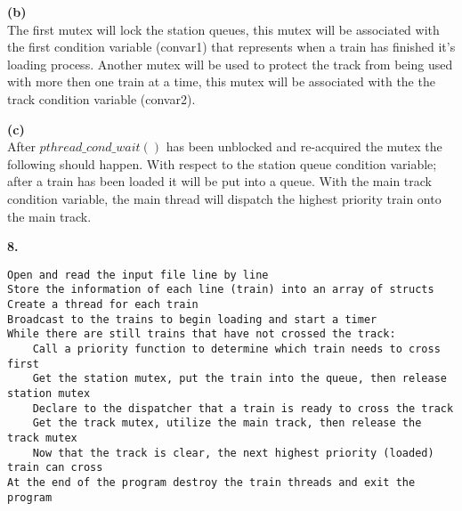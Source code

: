 \documentclass{article}
\begin{document}
\smallskip
{\bf (b)}\\
The first mutex will lock the station queues, this mutex will be associated with the first condition variable (convar1) that represents when a train has finished it's loading process.
Another mutex will be used to protect the track from being used with more then one train at a time, this mutex will be associated with the the track condition variable (convar2).

\smallskip
{\bf (c)}\\
After $pthread\_cond\_wait()$ has been unblocked and re-acquired the mutex the following should happen. With respect to the station queue condition variable; after a train has been loaded it will be put into a queue. With the main track condition variable, the main thread will dispatch the highest priority train onto the main track.


\bigskip
{\bf 8.}
\begin{lstlisting}
Open and read the input file line by line
Store the information of each line (train) into an array of structs
Create a thread for each train
Broadcast to the trains to begin loading and start a timer
While there are still trains that have not crossed the track:
    Call a priority function to determine which train needs to cross first
    Get the station mutex, put the train into the queue, then release station mutex
    Declare to the dispatcher that a train is ready to cross the track
    Get the track mutex, utilize the main track, then release the track mutex
    Now that the track is clear, the next highest priority (loaded) train can cross
At the end of the program destroy the train threads and exit the program
\end{lstlisting}
\end{document}
